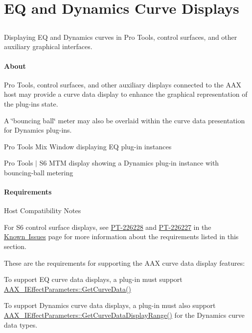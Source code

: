 \hypertarget{a00812}{}\section{EQ and Dynamics Curve Displays}
\label{a00812}


\subsection{ }
Displaying EQ and Dynamics curves in Pro Tools, control surfaces, and other auxiliary graphical interfaces. 

\paragraph*{About}

 Pro Tools, control surfaces, and other auxiliary displays connected to the A\+AX host may provide a curve data display to enhance the graphical representation of the plug-\/in\textquotesingle{}s state.

 A \char`\"{}bouncing ball\char`\"{} meter may also be overlaid within the curve data presentation for Dynamics plug-\/ins.

  Pro Tools Mix Window displaying EQ plug-\/in instances

  Pro Tools $\vert$ S6 M\+TM display showing a Dynamics plug-\/in instance with bouncing-\/ball metering



\paragraph*{Requirements}

 \begin{DoxyRefDesc}{Host Compatibility Notes}
\item[\mbox{\hyperlink{a00786__compatibility_notes000001}{Host Compatibility Notes}}]For S6 control surface displays, see \mbox{\hyperlink{a00846_PT-226228}{P\+T-\/226228}} and \mbox{\hyperlink{a00846_PT-226227}{P\+T-\/226227}} in the \mbox{\hyperlink{a00846}{Known Issues}} page for more information about the requirements listed in this section.\end{DoxyRefDesc}


 These are the requirements for supporting the A\+AX curve data display features\+:


\begin{DoxyItemize}
\item To support EQ curve data displays, a plug-\/in must support \mbox{\hyperlink{a00812_gaa85bda4027342eb644a9c92a17da6d49}{A\+A\+X\+\_\+\+I\+Effect\+Parameters\+::\+Get\+Curve\+Data()}}
\item To support Dynamics curve data displays, a plug-\/in must also support \mbox{\hyperlink{a00812_ga38d1ac0c15a7052904077ef0e2527e0d}{A\+A\+X\+\_\+\+I\+Effect\+Parameters\+::\+Get\+Curve\+Data\+Display\+Range()}} for the Dynamics curve data types.
\end{DoxyItemize}


